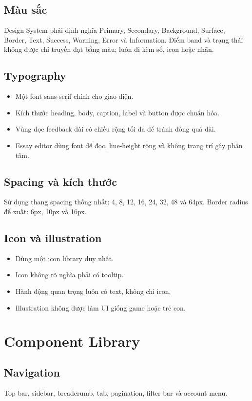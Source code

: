 \documentclass[11pt,a4paper]{article}
\begin{document}
\subsection{Màu sắc}
Design System phải định nghĩa Primary, Secondary, Background, Surface, Border, Text, Success, Warning, Error và Information. Điểm band và trạng thái không được chỉ truyền đạt bằng màu; luôn đi kèm số, icon hoặc nhãn.

\subsection{Typography}
\begin{itemize}
  \item Một font sans-serif chính cho giao diện.
  \item Kích thước heading, body, caption, label và button được chuẩn hóa.
  \item Vùng đọc feedback dài có chiều rộng tối đa để tránh dòng quá dài.
  \item Essay editor dùng font dễ đọc, line-height rộng và không trang trí gây phân tâm.
\end{itemize}

\subsection{Spacing và kích thước}
Sử dụng thang spacing thống nhất: 4, 8, 12, 16, 24, 32, 48 và 64px. Border radius đề xuất: 6px, 10px và 16px.

\subsection{Icon và illustration}
\begin{itemize}
  \item Dùng một icon library duy nhất.
  \item Icon không rõ nghĩa phải có tooltip.
  \item Hành động quan trọng luôn có text, không chỉ icon.
  \item Illustration không được làm UI giống game hoặc trẻ con.
\end{itemize}

\section{Component Library}

\subsection{Navigation}
Top bar, sidebar, breadcrumb, tab, pagination, filter bar và account menu.
\end{document}
